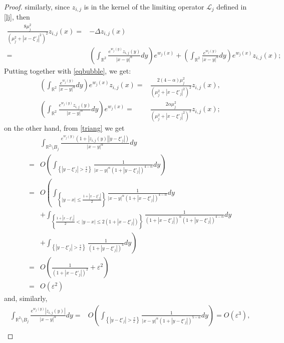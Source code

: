 \documentclass[11pt]{article}
\begin{document}
\begin{proof}
similarly, since $z_{i,j}$ is in the kernel of the limiting operator $\mathcal L_j$ defined in \eqref{lj}, then
\begin{align*}
\frac{8\mu_j^2}{\left(\mu_j^2+\left|x-\xi'_j\right|^2\right)^2}z_{i,j}(x)=&-\Delta z_{i,j}(x)\\
=&\left(\int_{\mathbb R^2}\frac{e^{w_j(y)}z_{i,j}(y)}{|x-y|^\alpha}dy\right)e^{w_j(x)}+\left(\int_{\mathbb R^2}\frac{e^{w_j(y)}}{|x-y|^\alpha}dy\right)e^{w_j(x)}z_{i,j}(x);
\end{align*}
Putting together with \eqref{eqbubble}, we get:
\begin{align*}
\left(\int_{\mathbb R^2}\frac{e^{w_j(y)}}{|x-y|^\alpha}dy\right)e^{w_j(x)}z_{i,j}(x)=&\frac{2(4-\alpha)\mu_j^2}{\left(\mu_j^2+\left|x-\xi'_j\right|^2\right)^2}z_{i,j}(x),\\
\left(\int_{\mathbb R^2}\frac{e^{w_j(y)}z_{i,j}(y)}{|x-y|^\alpha}dy\right)e^{w_j(x)}=&\frac{2\alpha\mu_j^2}{\left(\mu_j^2+\left|x-\xi'_j\right|^2\right)^2}z_{i,j}(x);
\end{align*}
on the other hand, from \eqref{triang} we get
\begin{align*}
&\int_{\mathbb R^2\setminus B_j}\frac{e^{w_j(y)}\left(1+|z_{i,j}(y)|\left|y-\xi'_j\right|\right)}{|x-y|^\alpha}dy\\
=&O\left(\int_{\left\{\left|y-\xi'_j\right|>\frac\tau\varepsilon\right\}}\frac1{|x-y|^\alpha\left(1+\left|y-\xi'_j\right|\right)^{4-\alpha}}dy\right)\\
=&O\left(\int_{\left\{|y-x|\le\frac{1+\left|x-\xi'_j\right|}2\right\}}\frac1{|x-y|^\alpha\left(1+\left|x-\xi'_j\right|\right)^{4-\alpha}}dy\right.\\
&\left.+\int_{\left\{\frac{1+\left|x-\xi'_j\right|}2<|y-x|\le2\left(1+\left|x-\xi'_j\right|\right)\right\}}\frac1{\left(1+\left|x-\xi'_j\right|\right)^\alpha\left(1+\left|y-\xi'_j\right|\right)^{4-\alpha}}dy\right.\\
&\left.+\int_{\left\{\left|y-\xi'_j\right|>\frac\tau\varepsilon\right\}}\frac1{\left(1+\left|y-\xi'_j\right|\right)^4}dy\right)\\
=&O\left(\frac1{\left(1+\left|x-\xi'_j\right|\right)^2}+\varepsilon^2\right)\\
=&O\left(\varepsilon^2\right)
\end{align*}
and, similarly,
\begin{align*}
\int_{\mathbb R^2\setminus B_j}\frac{e^{w_j(y)}|z_{i,j}(y)|}{|x-y|^\alpha}dy=&O\left(\int_{\left\{\left|y-\xi'_j\right|>\frac\tau\varepsilon\right\}}\frac1{|x-y|^\alpha\left(1+\left|y-\xi'_j\right|\right)^{5-\alpha}}dy\right)=O\left(\varepsilon^3\right),\\

\end{align*}
\end{proof}
\end{document}
